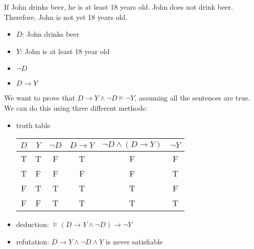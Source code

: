 \documentclass{article}
\begin{document}
\begin{exam}
    If John drinks beer, he is at least 18 years old. John does not drink
    beer. Therefore, John is not yet 18 years old.

    \begin{itemize}
        \item $D$: John drinks beer 
        \item $Y$: John is at least 18 year old
        \item $\neg D$
        \item $D\to Y$
    \end{itemize}

    We want to prove that $D\to Y\land\neg D\models\neg Y$, assuming all the
    sentences are true. We can do this using three different methods:
    \begin{itemize}
        \item truth table
            \begin{center}
                \begin{tabular}{@{ }c@{ }@{ }c | c@{ }c@{ }c@{ }c}
                    $D$ & $Y$ & $\neg D$ & $D\to Y$ & $\neg D \land (D\to Y)$
                        & $\neg Y$ \\
                    \hline
                    T & T & F & T & F & F \\
                    T & F & F & F & F & T \\
                    F & T & T & T & T & F \\
                    F & F & T & T & T & T \\
                \end{tabular}
            \end{center}
        \item deduction: $\models(D\to Y\land \neg D)\to \neg Y$
        \item refutation: $D\to Y\land \neg D\land Y$ is never
            satisfiable
    \end{itemize}
\end{exam}
\end{document}
